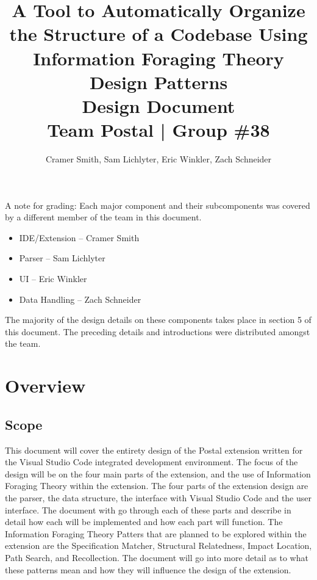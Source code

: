 \documentclass[letterpaper,10pt,titlepage,draftclsnofoot,onecolumn,onesided] {IEEEtran}
\def\doctitle{A Tool to Automatically Organize the Structure of a Codebase Using Information Foraging Theory Design Patterns}
\def\doctype{Design Document}
\def\team{Team Postal | Group \#38}
\begin{document}
\title{\Huge{\bfseries{\textsf{\doctitle}}}\\\textsf{\Large{\doctype}}\\\textsf{\large{\team}}}
\author{Cramer Smith, Sam Lichlyter, Eric Winkler, Zach Schneider}

\maketitle
\vfill
\vfill

\pagebreak

\tableofcontents

A note for grading: Each major component and their subcomponents was covered by a different member of the team in this document. 
\begin{itemize}
\item IDE/Extension -- Cramer Smith
\item Parser -- Sam Lichlyter
\item UI -- Eric Winkler
\item Data Handling -- Zach Schneider
\end{itemize}
The majority of the design details on these components takes place in section 5 of this document. The preceding details and introductions were distributed amongst the team.

\pagebreak

\section{Overview}

\subsection{Scope}
This document will cover the entirety design of the Postal extension written for the Visual Studio Code integrated development environment. 
The focus of the design will be on the four main parts of the extension, and the use of Information Foraging Theory within the extension.
The four parts of the extension design are the parser, the data structure, the interface with Visual Studio Code and the user interface.
The document with go through each of these parts and describe in detail how each will be implemented and how each part will function.
The Information Foraging Theory Patters that are planned to be explored within the extension are the Specification Matcher, Structural Relatedness, Impact Location, Path Search, and Recollection.
The document will go into more detail as to what these patterns mean and how they will influence the design of the extension.
\end{document}
